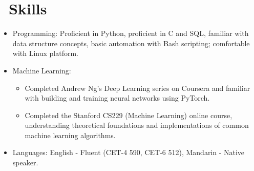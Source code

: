 \documentclass{resume}
\begin{document}
\section{\faCogs\ Skills}
\begin{itemize}
  \item Programming: Proficient in Python, proficient in C and SQL, familiar with data structure concepts, basic automation with Bash scripting; comfortable with Linux platform.
  \item Machine Learning:
        \begin{itemize}
          \item Completed Andrew Ng's Deep Learning series on Coursera and familiar with building and training neural networks using PyTorch.
          \item Completed the Stanford CS229 (Machine Learning) online course, understanding theoretical foundations and implementations of common machine learning algorithms.
        \end{itemize}
  \item Languages: English - Fluent (CET-4 590, CET-6 512), Mandarin - Native speaker.
\end{itemize}
\end{document}
